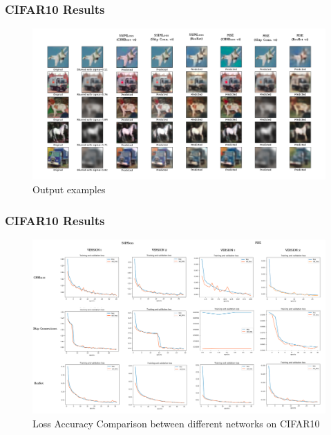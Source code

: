 \documentclass [handout] {beamer}
\begin{document}
\begin{frame}
	\frametitle{CIFAR10 Results}
	\begin{figure}[hptb]
	\centering
	\includegraphics[scale=0.19]{Outputs_comparison.png}
	\caption{Output examples}
	\label{CIFAR10Output}
	\end{figure}
\end{frame}

\begin{frame}
	\frametitle{CIFAR10 Results}
	\begin{figure}[hptb]
	\includegraphics[scale=0.14]{Loss_accuracy_comparison.png}
	\caption{Loss Accuracy Comparison between different networks on CIFAR10}
	\label{CIFAR10Loss}
	\end{figure}
\end{frame}
\end{document}
